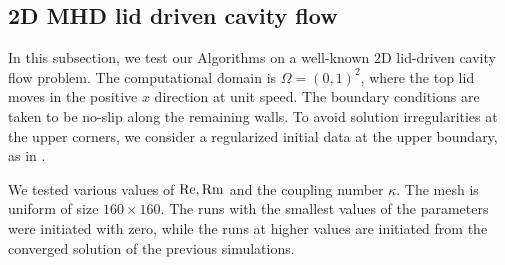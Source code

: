 \documentclass[3p]{elsarticle}
\begin{document}
\subsection{2D MHD lid driven cavity flow}\label{subsec:2DCavity}
In this subsection, we test our Algorithms on a well-known 2D lid-driven cavity flow problem. The computational domain is $\Omega = (0,1)^2$, where the top lid moves in the positive $x$ direction at unit speed. The boundary conditions are taken to be no-slip along the remaining walls. To avoid solution irregularities at the upper corners, we consider a regularized initial data at the upper boundary, as in \cite{Frutos2016}.

We tested various values of ${\rm Re}, {\rm Rm}$ and the coupling number $\kappa$. The mesh is uniform of size $160 \times 160$. The runs with the smallest values of the parameters were initiated with zero, while the runs at higher values are initiated from the converged solution of the previous simulations.
\end{document}
